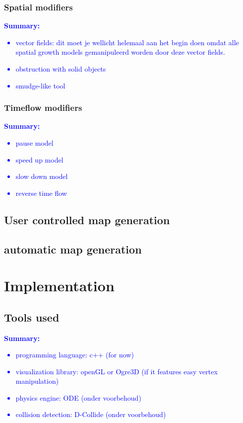\documentclass{article}
\newcommand{\inhoud}[1]{\textcolor{blue}{\textbf{\newline Summary: }\it{#1}}}
\begin{document}
\subsubsection{Spatial modifiers}

\inhoud{
\begin{itemize}
\item vector fields: dit moet je wellicht helemaal aan het begin doen omdat alle spatial growth models
gemanipuleerd worden door deze vector fields.
\item obstruction with solid objects
\item smudge-like tool
\end{itemize}
}

\subsubsection{Timeflow modifiers}
\inhoud{
\begin{itemize}
\item pause model
\item speed up model
\item slow down model
\item reverse time flow
\end{itemize}
}


\subsection{User controlled map generation}

\subsection{automatic map generation} 


\section{Implementation}
\subsection{Tools used}
\inhoud{ 
\begin{itemize}
\item programming language: c++ (for now)
\item visualization library: openGL or Ogre3D (if it features easy vertex manipulation) 
\item physics engine: ODE (onder voorbehoud)  
\item collision detection: D-Collide (onder voorbehoud)
\end{itemize}
}
\end{document}
